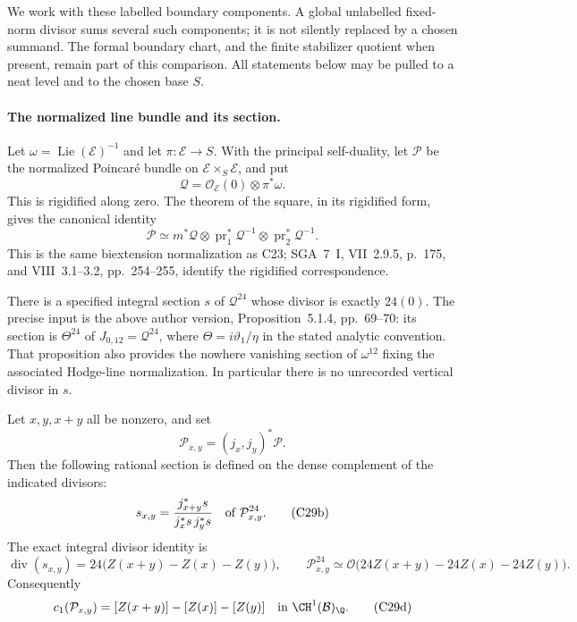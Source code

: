 We work with these labelled boundary components. A global
unlabelled fixed-norm divisor sums several such components;
it is not silently replaced by a chosen summand. The formal
boundary chart, and the finite stabilizer quotient when
present, remain part of this comparison. All statements
below may be pulled to a neat level and to the chosen
base $S$.

\paragraph{The normalized line bundle and its section.}
Let $\omega=\operatorname{Lie}(\mathcal E)^{-1}$ and let
$\pi:\mathcal E\to S$. With the principal self-duality,
let $\mathcal P$ be the normalized Poincar\'e bundle on
$\mathcal E\times_S\mathcal E$, and put
\[
       \mathcal Q=\mathcal O_{\mathcal E}(0)\otimes\pi^*\omega.
\]
This is rigidified along zero. The theorem of the square,
in its rigidified form, gives the canonical identity
\[
 \mathcal P\simeq m^*\mathcal Q\otimes
          \operatorname{pr}_1^*\mathcal Q^{-1}\otimes
          \operatorname{pr}_2^*\mathcal Q^{-1}.
 \tag{C29a}
\]
This is the same biextension normalization as C23;
SGA~7~I, VII~2.9.5, p.~175, and VIII~3.1--3.2,
pp.~254--255, identify the rigidified correspondence.

There is a specified integral section $s$ of
$\mathcal Q^{24}$ whose divisor is exactly $24(0)$.
The precise input is the above author version,
Proposition~5.1.4, pp.~69--70: its section is
$\Theta^{24}$ of $J_{0,12}=\mathcal Q^{24}$,
where $\Theta=i\vartheta_1/\eta$ in the stated analytic
convention. That proposition also provides the nowhere
vanishing section of $\omega^{12}$ fixing the associated
Hodge-line normalization. In particular there is no
unrecorded vertical divisor in $s$.

Let $x,y,x+y$ all be nonzero, and set
\[
        \mathcal P_{x,y}=(j_x,j_y)^*\mathcal P.
\]
Then the following rational section is defined on the
dense complement of the indicated divisors:
\[
  s_{x,y}=\frac{j_{x+y}^*s}{j_x^*s\,j_y^*s}
                 \quad\hbox{of }\mathcal P_{x,y}^{24}.
 \tag{C29b}
\]
The exact integral divisor identity is
\[
 \operatorname{div}(s_{x,y})=
       24\bigl(Z(x+y)-Z(x)-Z(y)\bigr),
 \qquad
 \mathcal P_{x,y}^{24}\simeq
       \mathcal O\bigl(24Z(x+y)-24Z(x)-24Z(y)\bigr).
 \tag{C29c}
\]
Consequently
\[
       c_1(\mathcal P_{x,y})
                  =[Z(x+y)]-[Z(x)]-[Z(y)]
                         \quad\hbox{in }\CH^1(\mathcal B)_\Q.
 \tag{C29d}
\]

